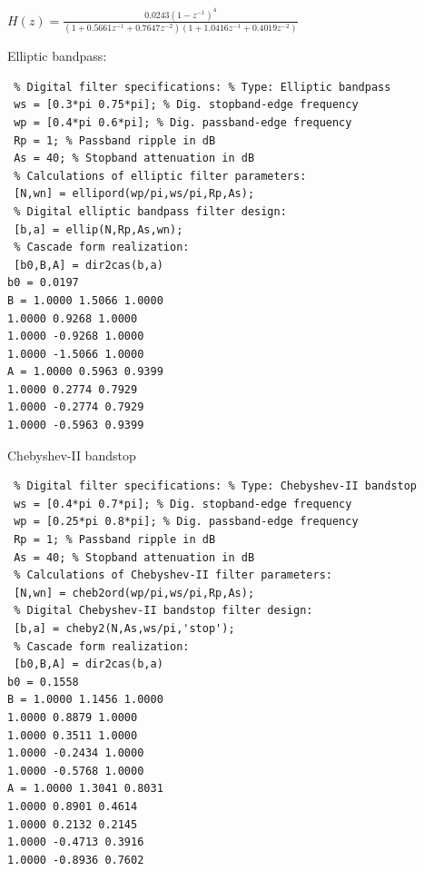 \documentclass{article}
\begin{document}
\begin{center}
$H(z)=\frac{0.0243(1-z^{-1})^4}{(1+0.5661z^{-1}+0.7647z^{-2})(1+1.0416z^{-1}+0.4019z^{-2})}$
\end{center}
Elliptic bandpass: 
\begin{lstlisting}
 % Digital filter specifications: % Type: Elliptic bandpass
 ws = [0.3*pi 0.75*pi]; % Dig. stopband-edge frequency
 wp = [0.4*pi 0.6*pi]; % Dig. passband-edge frequency
 Rp = 1; % Passband ripple in dB
 As = 40; % Stopband attenuation in dB  
 % Calculations of elliptic filter parameters:
 [N,wn] = ellipord(wp/pi,ws/pi,Rp,As);
 % Digital elliptic bandpass filter design:
 [b,a] = ellip(N,Rp,As,wn);
 % Cascade form realization:
 [b0,B,A] = dir2cas(b,a)
b0 = 0.0197
B = 1.0000 1.5066 1.0000
1.0000 0.9268 1.0000
1.0000 -0.9268 1.0000
1.0000 -1.5066 1.0000
A = 1.0000 0.5963 0.9399
1.0000 0.2774 0.7929
1.0000 -0.2774 0.7929
1.0000 -0.5963 0.9399
\end{lstlisting}
Chebyshev-II bandstop 
\begin{lstlisting}
 % Digital filter specifications: % Type: Chebyshev-II bandstop
 ws = [0.4*pi 0.7*pi]; % Dig. stopband-edge frequency
 wp = [0.25*pi 0.8*pi]; % Dig. passband-edge frequency
 Rp = 1; % Passband ripple in dB
 As = 40; % Stopband attenuation in dB
 % Calculations of Chebyshev-II filter parameters:
 [N,wn] = cheb2ord(wp/pi,ws/pi,Rp,As);
 % Digital Chebyshev-II bandstop filter design:
 [b,a] = cheby2(N,As,ws/pi,'stop');
 % Cascade form realization:
 [b0,B,A] = dir2cas(b,a)
b0 = 0.1558
B = 1.0000 1.1456 1.0000
1.0000 0.8879 1.0000
1.0000 0.3511 1.0000
1.0000 -0.2434 1.0000
1.0000 -0.5768 1.0000    
A = 1.0000 1.3041 0.8031
1.0000 0.8901 0.4614
1.0000 0.2132 0.2145
1.0000 -0.4713 0.3916
1.0000 -0.8936 0.7602

\end{lstlisting}

\newpage
\end{document}
